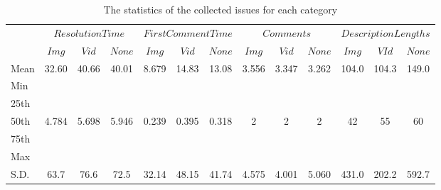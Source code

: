 \begin{table*}[t]
  \begin{center}
  \caption{The statistics of the collected issues for each category }
  \begin{tabular}{l c c c| c c c| c c c| c c c} 
    \toprule
    & \multicolumn{3}{c}{$ResolutionTime$} & \multicolumn{3}{c}{$FirstCommentTime$} & \multicolumn{3}{c}{$Comments$} & \multicolumn{3}{c}{$DescriptionLengths$}\\
    & \textbf{$Img$} & \textbf{$Vid$} & \textbf{$None$} & \textbf{$Img$} & \textbf{$Vid$} & \textbf{$None$} & \textbf{$Img$} & \textbf{$Vid$} & \textbf{$None$} & \textbf{$Img$} & \textbf{$VId$} & \textbf{$None$} \\ 
    \midrule
    Mean & 32.60 & 40.66   & 40.01   & 8.679 & 14.83 & 13.08 &  3.556 & 3.347 & 3.262 &  104.0 & 104.3 & 149.0 \\
    Min  &       &         &         &       &       &       &        &       &       &        &       &   \\
    25th &       &         &         &       &       &       &        &       &       &        &       &   \\
    50th & 4.784 & 5.698   & 5.946   & 0.239 & 0.395 & 0.318 &  2     & 2     & 2     & 42     & 55    & 60 \\
    75th &       &         &         &       &       &       &        &       &       &  &     & \\
    Max  &       &         &         &       &       &       &        &       &       &  &  &  \\
    S.D. & 63.7  & 76.6    & 72.5    & 32.14 & 48.15 & 41.74 &  4.575 & 4.001 & 5.060 & 431.0 & 202.2 & 592.7 \\
    \bottomrule
  \end{tabular}
  \label{tab:issue_stat_categories}
  \end{center}
\end{table*}
